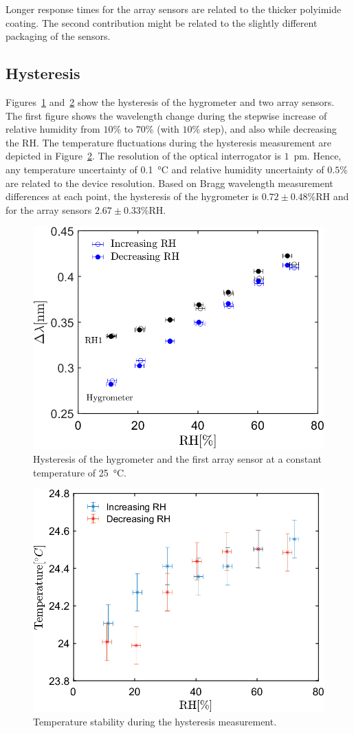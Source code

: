 Longer response times for the array sensors are related to the thicker polyimide coating. The second contribution might be related to the slightly different packaging of the sensors. 

\subsection{Hysteresis}
Figures~\ref{fig_hysteresis} and~\ref{fig_hysteresis2} show the hysteresis of the hygrometer and two array sensors. The first figure shows the wavelength change during the stepwise increase of relative humidity from $10$\% to $70$\% (with $10$\% step), and also while decreasing the \gls{RH}. The temperature fluctuations during the hysteresis measurement are depicted in Figure~\ref{fig_hysteresis2}. The resolution of the optical interrogator is $1$~pm. Hence, any temperature uncertainty of \SI{0.1}{\celsius} and relative humidity uncertainty of $0.5$\% are related to the device resolution. Based on Bragg wavelength measurement differences at each point, the hysteresis of the hygrometer is $0.72\pm0.48$\%RH and for the array sensors $2.67\pm0.33$\%RH. 

\begin{figure}[!h]
\centering
\includegraphics[width=0.57\columnwidth]{Chapter5/images/25_RHS.png}
\caption{Hysteresis of the hygrometer and the first array sensor at a constant temperature of \SI{25}{\celsius}.}
\label{fig_hysteresis}
\end{figure}

\begin{figure}[!h]
\centering
\includegraphics[width=0.57\columnwidth]{Chapter5/images/25_RHST.png}
\caption{Temperature stability during the hysteresis measurement.}
\label{fig_hysteresis2}
\end{figure}
\newpage
